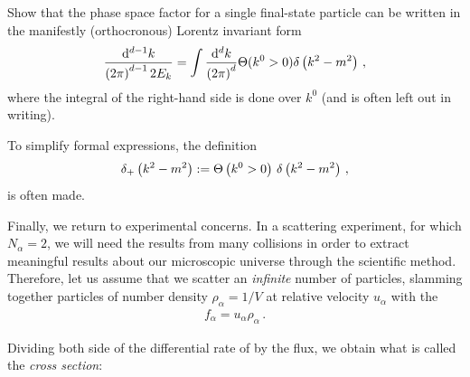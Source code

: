 \begin{exercise}
    \label{ex:lorentz-invariant-phase-space}

    Show that the phase space factor for a single final-state particle can be written in the manifestly (orthocronous) Lorentz invariant form
    \begin{align}
        \frac{\dd^{d-1} k}{\left(2\pi\right)^{d-1} 2 E_k}
        =
        \int
        \frac{\dd^d k}{\left(2\pi\right)^d}
        \Theta(k^0 > 0) \delta\left(k^2 - m^2\right)
        \,,
    \end{align}
    where the integral of the right-hand side is done over \(k^0\) (and is often left out in writing).

    To simplify formal expressions, the definition
    \begin{align}
        \delta_+\left(k^2 - m^2\right)
        :=
        \Theta\left(k^0 > 0\right)\,\delta\left(k^2 - m^2\right)
        \,,
    \end{align}
    is often made.
\end{exercise}


Finally, we return to experimental concerns.
%
In a scattering experiment, for which \(N_\alpha = 2\), we will need the results from many collisions in order to extract meaningful results about our microscopic universe through the scientific method.
%
Therefore, let us assume that we scatter an \textit{infinite} number of particles, slamming together particles of number density \(\rho_\alpha = 1/V\) at relative velocity \(u_{\alpha}\) with the 
\begin{align}
    f_\alpha = u_\alpha \rho_\alpha
    \,.
\end{align}

Dividing both side of the differential rate of  by the flux, we obtain what is called the \textit{cross section}:

